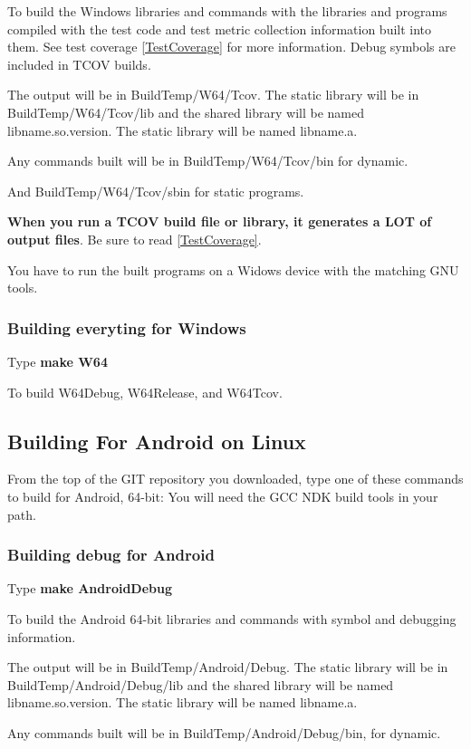 To build the Windows libraries and commands with the libraries
and programs compiled with the test code and test metric
collection information built into them.
See test coverage \ref{TestCoverage} for more information.
Debug symbols are included in TCOV builds.

The output will be in BuildTemp/W64/Tcov.
The static library will be in BuildTemp/W64/Tcov/lib
and the shared library will be named lib{name}.so.{version}.
The static library will be named lib{name}.a.
  
Any commands built will be in BuildTemp/W64/Tcov/bin
for dynamic.

And BuildTemp/W64/Tcov/sbin for static programs.

\textbf{When you run a TCOV build file or library, it generates a LOT of  output files}. Be sure to read \ref{TestCoverage}.
  
You have to run the built programs on a Widows device
with the matching GNU tools.
  
\subsubsection{Building everyting for Windows}
Type \textbf{make W64}

To build W64Debug, W64Release, and W64Tcov.

\subsection{Building For Android on Linux}
  
From the top of the GIT repository you downloaded,
type one of these commands to build for Android, 64-bit:
You will need the GCC NDK build tools in your path.

\subsubsection{Building debug for Android}
Type \textbf{make AndroidDebug}

To build the Android 64-bit libraries and commands with symbol
and debugging information.

The output will be in BuildTemp/Android/Debug.
The static library will be in BuildTemp/Android/Debug/lib
and the shared library will be named lib{name}.so.{version}.
The static library will be named lib{name}.a.
  
Any commands built will be in BuildTemp/Android/Debug/bin,
for dynamic.
  
